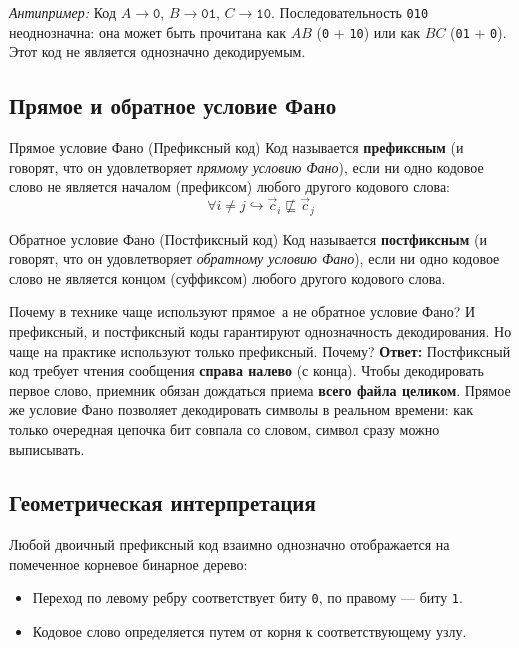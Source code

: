 \documentclass[11pt,a4paper]{article}
\begin{document}
\textit{Антипример:} Код $A \to \texttt{0}$, $B \to \texttt{01}$, $C \to \texttt{10}$. Последовательность \texttt{010} неоднозначна: она может быть прочитана как $AB$ (\texttt{0} + \texttt{10}) или как $BC$ (\texttt{01} + \texttt{0}). Этот код не является однозначно декодируемым.

\subsection{Прямое и обратное условие Фано}

\begin{definitionbox}{Прямое условие Фано (Префиксный код)}
Код называется \textbf{префиксным} (и говорят, что он удовлетворяет \textit{прямому условию Фано}), если ни одно кодовое слово не является началом (префиксом) любого другого кодового слова:
$$\forall i \neq j \hookrightarrow \vec{c}_i \not\sqsubseteq \vec{c}_j$$
\end{definitionbox}

\begin{definitionbox}{Обратное условие Фано (Постфиксный код)}
Код называется \textbf{постфиксным} (и говорят, что он удовлетворяет \textit{обратному условию Фано}), если ни одно кодовое слово не является концом (суффиксом) любого другого кодового слова.
\end{definitionbox}

\begin{questionbox}{Почему в технике чаще используют прямое\, а не обратное условие Фано?}
И префиксный, и постфиксный коды гарантируют однозначность декодирования. Но чаще на практике используют только префиксный. Почему?
\tcblower
\textbf{Ответ:} Постфиксный код требует чтения сообщения \textbf{справа налево} (с конца).  
Чтобы декодировать первое слово, приемник обязан дождаться приема \textbf{всего файла целиком}. Прямое же условие Фано позволяет декодировать символы в реальном времени: как только очередная цепочка бит совпала со словом, символ сразу можно выписывать.
\end{questionbox}

\subsection{Геометрическая интерпретация}

Любой двоичный префиксный код взаимно однозначно отображается на помеченное корневое бинарное дерево:
\begin{itemize}
    \item Переход по левому ребру соответствует биту \texttt{0}, по правому --- биту \texttt{1}.
    \item Кодовое слово определяется путем от корня к соответствующему узлу.
\end{itemize}
\end{document}
